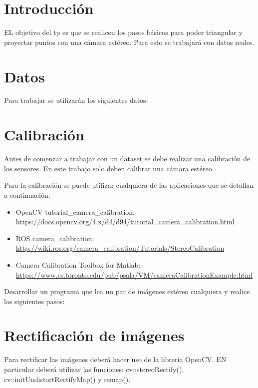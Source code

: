 \documentclass[tp]{lcc}
\begin{document}
\maketitle

\section{Introducción}

EL objetivo del tp es que se realicen los pasos básicos para poder triangular y proyectar puntos con una cámara estéreo. 
Para esto se trabajará con datos reales.

\section{Datos}
Para trabajar se utilizarán los siguientes datos:

\section{Calibración}
Antes de comenzar a trabajar con un dataset se debe realizar una calibración de los sensores. En este trabajo solo deben calibrar una cámara estéreo.

Para la calibración se puede utilizar cualquiera de las aplicaciones que se detallan a continuación:
\begin{itemize}
	\item OpenCV tutorial\_camera\_calibration: \href{https://docs.opencv.org/4.x/d4/d94/tutorial_camera_calibration.html}{https://docs.opencv.org/4.x/d4/d94/tutorial\_camera\_calibration.html}
	\item ROS camera\_calibration: \href{http://wiki.ros.org/camera_calibration/Tutorials/StereoCalibration}{http://wiki.ros.org/camera\_calibration/Tutorials/StereoCalibration}
	\item Camera Calibration Toolbox for Matlab: \href{https://www.cs.toronto.edu/pub/psala/VM/cameraCalibrationExample.html}{https://www.cs.toronto.edu/pub/psala/VM/cameraCalibrationExample.html}
\end{itemize}



Desarrollar un programa que lea un par de imágenes estéreo cualquiera y realice los siguientes pasos:

\section{Rectificación de imágenes}
Para rectificar las imágenes deberá hacer uso de la librería OpenCV. EN particular deberá utilizar las funciones: cv::stereoRectify(), cv::initUndistortRectifyMap() y remap().
\end{document}
